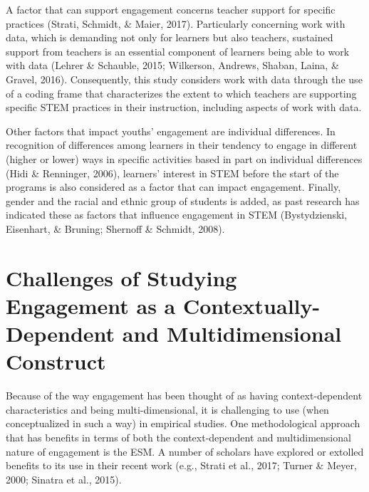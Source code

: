 \documentclass[]{book}
\theoremstyle{definition}
\theoremstyle{definition}
\theoremstyle{definition}
\theoremstyle{remark}
\begin{document}
A factor that can support engagement concerns teacher support for
specific practices (Strati, Schmidt, \& Maier, 2017). Particularly
concerning work with data, which is demanding not only for learners but
also teachers, sustained support from teachers is an essential component
of learners being able to work with data (Lehrer \& Schauble, 2015;
Wilkerson, Andrews, Shaban, Laina, \& Gravel, 2016). Consequently, this
study considers work with data through the use of a coding frame that
characterizes the extent to which teachers are supporting specific STEM
practices in their instruction, including aspects of work with data.

Other factors that impact youths' engagement are individual differences.
In recognition of differences among learners in their tendency to engage
in different (higher or lower) ways in specific activities based in part
on individual differences (Hidi \& Renninger, 2006), learners' interest
in STEM before the start of the programs is also considered as a factor
that can impact engagement. Finally, gender and the racial and ethnic
group of students is added, as past research has indicated these as
factors that influence engagement in STEM (Bystydzienski, Eisenhart, \&
Bruning; Shernoff \& Schmidt, 2008).

\section{Challenges of Studying Engagement as a Contextually-Dependent
and Multidimensional
Construct}\label{challenges-of-studying-engagement-as-a-contextually-dependent-and-multidimensional-construct}

Because of the way engagement has been thought of as having
context-dependent characteristics and being multi-dimensional, it is
challenging to use (when conceptualized in such a way) in empirical
studies. One methodological approach that has benefits in terms of both
the context-dependent and multidimensional nature of engagement is the
ESM. A number of scholars have explored or extolled benefits to its use
in their recent work (e.g., Strati et al., 2017; Turner \& Meyer, 2000;
Sinatra et al., 2015).
\end{document}
